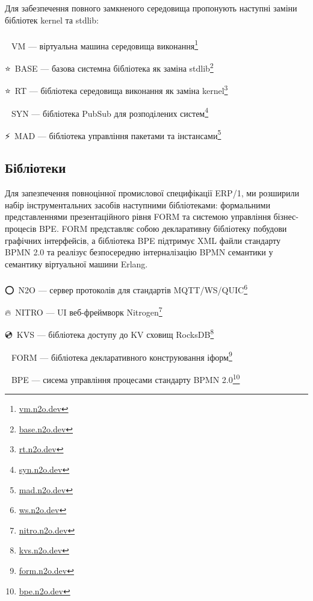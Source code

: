 Для забезпечення повного замкненого середовища пропонують наступні заміни бібліотек kernel та stdlib: \\
\\ \indent
\setmainfont{Segoe UI Emoji}🚀\setmainfont{Times New Roman}\ VM --- віртуальна машина середовища виконання\footnote{\url{vm.n2o.dev}}

\setmainfont{Segoe UI Emoji}⭐\setmainfont{Times New Roman}\ BASE --- базова системна бібліотека як заміна stdlib\footnote{\url{base.n2o.dev}}

\setmainfont{Segoe UI Emoji}⭐\setmainfont{Times New Roman}\ RT --- бібліотека середовища виконання як заміна kernel\footnote{\url{rt.n2o.dev}}

\setmainfont{Segoe UI Emoji}📨\setmainfont{Times New Roman}\ SYN --- бібліотека PubSub для розподілених систем\footnote{\url{syn.n2o.dev}}

\setmainfont{Segoe UI Emoji}⚡\setmainfont{Times New Roman}\ MAD --- бібліотека управління пакетами та інстансами\footnote{\url{mad.n2o.dev}}

\newpage
\subsection{Бібліотеки}

Для запезпечення повноцінної промислової специфікації ERP/1, ми розширили
набір інструментальних засобів наступними бібліотеками: формальними представленнями
презентаційного рівня FORM та системою управління бізнес-процесів BPE. FORM представляє
собою декларативну бібліотеку побудови графічних інтерфейсів, а бібліотека BPE
підтримує XML файли стандарту BPMN 2.0 та реалізує безпосередню інтерналізацію
BPMN семантики у семантику віртуальної машини Erlang. \\
\\ \indent
\setmainfont{Segoe UI Emoji}⭕\setmainfont{Times New Roman}\ N2O --- сервер протоколів для стандартів MQTT/WS/QUIC\footnote{\url{ws.n2o.dev}}

\setmainfont{Segoe UI Emoji}🔥\setmainfont{Times New Roman}\ NITRO --- UI веб-фреймворк Nitrogen\footnote{\url{nitro.n2o.dev}}

\setmainfont{Segoe UI Emoji}💿\setmainfont{Times New Roman}\ KVS --- бібліотека доступу до KV сховищ RocksDB\footnote{\url{kvs.n2o.dev}}

\setmainfont{Segoe UI Emoji}📜\setmainfont{Times New Roman}\ FORM --- бібліотека декларативного конструювання іформ\footnote{\url{form.n2o.dev}}

\setmainfont{Segoe UI Emoji}💠\setmainfont{Times New Roman}\ BPE --- сисема управління процесами стандарту BPMN 2.0\footnote{\url{bpe.n2o.dev}}

